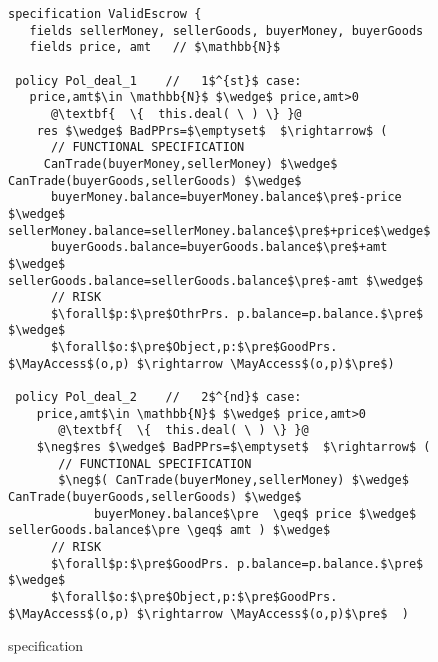 \begin{figure*}[hbt]
\begin{lstlisting}[escapechar=@]
specification ValidEscrow {
   fields sellerMoney, sellerGoods, buyerMoney, buyerGoods
   fields price, amt   // $\mathbb{N}$

 policy Pol_deal_1    //   1$^{st}$ case:
   price,amt$\in \mathbb{N}$ $\wedge$ price,amt>0
      @\textbf{  \{  this.deal( \ ) \} }@
    res $\wedge$ BadPPrs=$\emptyset$  $\rightarrow$ (
      // FUNCTIONAL SPECIFICATION
     CanTrade(buyerMoney,sellerMoney) $\wedge$                            CanTrade(buyerGoods,sellerGoods) $\wedge$
      buyerMoney.balance=buyerMoney.balance$\pre$-price $\wedge$              sellerMoney.balance=sellerMoney.balance$\pre$+price$\wedge$
      buyerGoods.balance=buyerGoods.balance$\pre$+amt $\wedge$                sellerGoods.balance=sellerGoods.balance$\pre$-amt $\wedge$
      // RISK
      $\forall$p:$\pre$OthrPrs. p.balance=p.balance.$\pre$  $\wedge$
      $\forall$o:$\pre$Object,p:$\pre$GoodPrs.                                     $\MayAccess$(o,p) $\rightarrow \MayAccess$(o,p)$\pre$)

 policy Pol_deal_2    //   2$^{nd}$ case:
    price,amt$\in \mathbb{N}$ $\wedge$ price,amt>0
       @\textbf{  \{  this.deal( \ ) \} }@
    $\neg$res $\wedge$ BadPPrs=$\emptyset$  $\rightarrow$ (
       // FUNCTIONAL SPECIFICATION
       $\neg$( CanTrade(buyerMoney,sellerMoney) $\wedge$                          CanTrade(buyerGoods,sellerGoods) $\wedge$
            buyerMoney.balance$\pre  \geq$ price $\wedge$                            sellerGoods.balance$\pre \geq$ amt ) $\wedge$
      // RISK
      $\forall$p:$\pre$GoodPrs. p.balance=p.balance.$\pre$   $\wedge$
      $\forall$o:$\pre$Object,p:$\pre$GoodPrs.                                        $\MayAccess$(o,p) $\rightarrow \MayAccess$(o,p)$\pre$  )
\end{lstlisting}
\vspace*{-7mm}
\caption{ specification}
\label{fig:ValidEscrow}
\end{figure*}
%
\addtocounter{figure}{-1}
%
